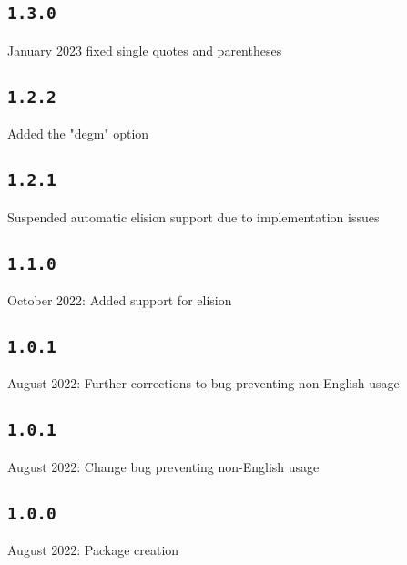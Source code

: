 \documentclass{article}
\begin{document}
\subsection*{\normalfont\texttt{1.3.0}}
 January 2023 fixed single quotes and parentheses


\subsection*{\normalfont\texttt{1.2.2}}
\ttfamily Added the "degm" option

\subsection*{\normalfont\texttt{1.2.1}}
\ttfamily Suspended automatic elision support due to implementation issues

\subsection*{\normalfont\texttt{1.1.0}}
 October 2022: Added support for elision


\subsection*{\normalfont\texttt{1.0.1}}



 August 2022: Further corrections to bug preventing non-English usage

\subsection*{\normalfont\texttt{1.0.1}}

 August 2022: Change bug preventing non-English usage


\subsection*{\normalfont\texttt{1.0.0}}

 August 2022: Package creation

	
\end{document}
